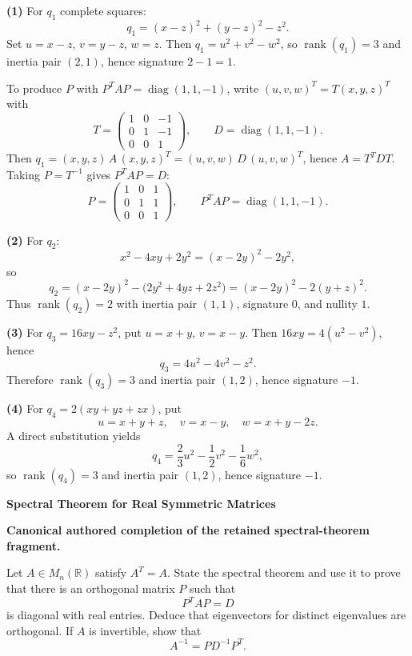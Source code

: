 \begin{solution}
\textbf{(1) } For $q_1$ complete squares:
\[
q_1=(x-z)^2+(y-z)^2-z^2.
\]
Set $u=x-z$, $v=y-z$, $w=z$. Then $q_1=u^2+v^2-w^2$, so $\operatorname{rank}(q_1)=3$ and inertia pair $(2,1)$, hence signature $2-1=1$.

To produce $P$ with $P^TAP=\operatorname{diag}(1,1,-1)$, write $(u,v,w)^T=T(x,y,z)^T$ with
\[
T=\begin{pmatrix}1&0&-1\\[2pt]0&1&-1\\[2pt]0&0&1\end{pmatrix},\qquad D=\operatorname{diag}(1,1,-1).
\]
Then $q_1=(x,y,z)\,A\,(x,y,z)^T=(u,v,w)\,D\,(u,v,w)^T$, hence $A=T^TDT$.
Taking $P=T^{-1}$ gives $P^TAP=D$:
\[
P=\begin{pmatrix}1&0&1\\[2pt]0&1&1\\[2pt]0&0&1\end{pmatrix},\qquad
P^TAP=\operatorname{diag}(1,1,-1).
\]

\textbf{(2) } For $q_2$:
\[
x^2-4xy+2y^2=(x-2y)^2-2y^2,
\]
so
\[
q_2=(x-2y)^2-\bigl(2y^2+4yz+2z^2\bigr)=(x-2y)^2-2(y+z)^2.
\]
Thus $\operatorname{rank}(q_2)=2$ with inertia pair $(1,1)$, signature $0$, and nullity $1$.

\textbf{(3) } For $q_3=16xy-z^2$, put $u=x+y$, $v=x-y$. Then $16xy=4(u^2-v^2)$, hence
\[
q_3=4u^2-4v^2-z^2.
\]
Therefore $\operatorname{rank}(q_3)=3$ and inertia pair $(1,2)$, hence signature $-1$.

\textbf{(4) } For $q_4=2(xy+yz+zx)$, put
\[
u=x+y+z,\quad v=x-y,\quad w=x+y-2z.
\]
A direct substitution yields
\[
q_4=\frac{2}{3}u^2-\frac{1}{2}v^2-\frac{1}{6}w^2,
\]
so $\operatorname{rank}(q_4)=3$ and inertia pair $(1,2)$, hence signature $-1$.
\end{solution}

\begin{problem}[CP-I-0113]
\label{prob:cp-i-0113}
\textbf{Spectral Theorem for Real Symmetric Matrices}

\textbf{Canonical authored completion of the retained spectral-theorem fragment.}

\hspace*{1.5em}Let \(A\in M_n(\mathbb R)\) satisfy \(A^T=A\).
State the spectral theorem and use it to prove that there is an orthogonal matrix \(P\) such that
\[
P^TAP=D
\]
is diagonal with real entries. Deduce that eigenvectors for distinct eigenvalues are orthogonal.
If \(A\) is invertible, show that
\[
A^{-1}=PD^{-1}P^T.
\]
\end{problem}

